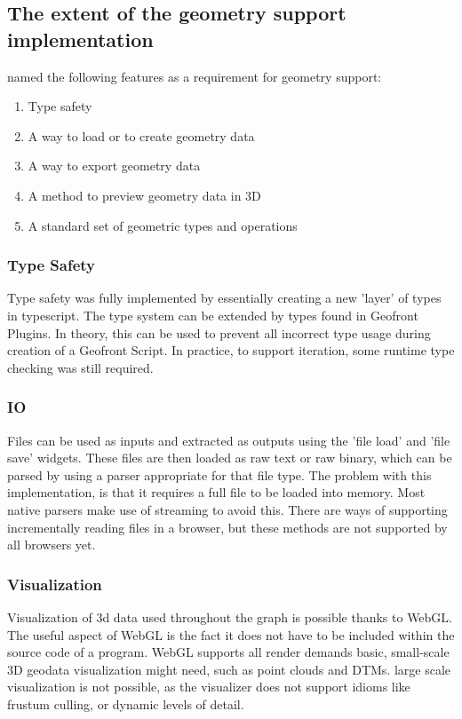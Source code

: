 \subsection*{The extent of the geometry support implementation}

 named the following features as a requirement for geometry support:
\begin{enumerate}[-]
  \item Type safety 
  \item A way to load or to create geometry data 
  \item A way to export geometry data
  \item A method to preview geometry data in 3D
  \item A standard set of geometric types and operations
\end{enumerate}

\subsubsection*{Type Safety}
Type safety was fully implemented by essentially creating a new 'layer' of types in typescript.
The type system can be extended by types found in Geofront Plugins.  
In theory, this can be used to prevent all incorrect type usage during creation of a Geofront Script.
In practice, to support iteration, some runtime type checking was still required. 

\subsubsection*{IO}
Files can be used as inputs and extracted as outputs using the 'file load' and 'file save' widgets. 
These files are then loaded as raw text or raw binary, which can be parsed by using a parser appropriate for that file type. 
The problem with this implementation, is that it requires a full file to be loaded into memory. 
Most native parsers make use of streaming to avoid this. 
There are ways of supporting incrementally reading files in a browser, but these methods are not supported by all browsers yet. 

\subsubsection*{Visualization}
Visualization of 3d data used throughout the graph is possible thanks to WebGL. 
The useful aspect of WebGL is the fact it does not have to be included within the source code of a program. 
WebGL supports all render demands basic, small-scale 3D geodata visualization might need, such as point clouds and DTMs.
large scale visualization is not possible, as the visualizer does not support idioms like frustum culling, or dynamic levels of detail. 

